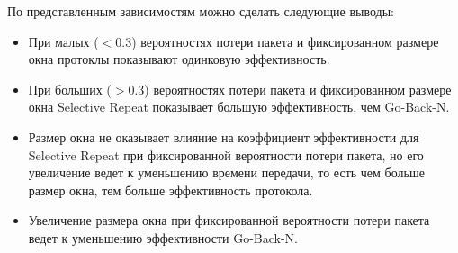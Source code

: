 \documentclass{report}
\begin{document}
\newpage
По представленным зависимостям можно сделать следующие выводы:
\begin{itemize}
    \item При малых ($<0.3$) вероятностях потери пакета и фиксированном размере окна протоклы показывают одинковую эффективность.
    \item При больших ($>0.3$) вероятностях потери пакета и фиксированном размере окна Selective Repeat показывает большую эффективность, чем Go-Back-N.
    \item Размер окна не оказывает влияние на коэффициент эффективности для Selective Repeat при фиксированной вероятности потери пакета, но его увеличение ведет к уменьшению времени передачи, то есть чем больше размер окна, тем больше эффективность протокола.
    \item Увеличение размера окна при фиксированной вероятности потери пакета ведет к уменьшению эффективности Go-Back-N.
\end{itemize}
\end{document}
